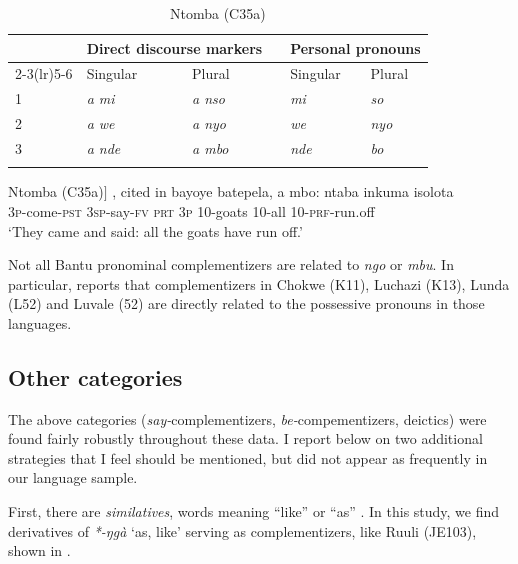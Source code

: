 \documentclass[output=paper,colorlinks,citecolor=brown,
]{langscibook}
\begin{document}
\begin{table}
\caption{Ntomba (C35a) \citep[209]{Botne:1995}}
\label{tab:gluckman:particletable}
\begin{tabular}{l l l l l l}
\lsptoprule
& \multicolumn{2}{l}{Direct discourse markers} & & \multicolumn{2}{l}{Personal pronouns}\\
\cmidrule(lr){2-3}\cmidrule(lr){5-6}
& Singular & Plural & & Singular & Plural\\
\midrule
1 & \textit{a mi} & \textit{a nso} & & \textit{mi} & \textit{so}\\
2 & \textit{a we} & \textit{a nyo} & & \textit{we} & \textit{nyo}\\
3 & \textit{a nde} & \textit{a mbo} & & \textit{nde} & \textit{bo}\\
\lspbottomrule
\end{tabular}
\end{table}

\ea\label{ex:gluckman:intomba.particle} Ntomba (C35a)$]$ \citep[69]{Gilliard:1928}, cited in \citep[208]{Botne:1995} 
\gll bayoye batepela, a mbo: ntaba inkuma isolota\\
3\textsc{p}-come-\textsc{pst} 3\textsc{sp}-say-\textsc{fv} \textsc{prt} 3\textsc{p} 10-goats 10-all 10-\textsc{prf}-run.off\\
\glt `They came and said: all the goats have run off.'  
\z

\noindent Not all Bantu pronominal complementizers are related to \textit{ngo} or \textit{mbu}. In particular, \citet{Kawasha:2006, Kawasha:2007} reports that complementizers in Chokwe (K11), Luchazi (K13), Lunda (L52) and Luvale (52) are directly related to the possessive pronouns in those languages. 

\subsection{Other categories}\label{sec:gluckman:minorcompsection}
The above categories (\textit{say-}complementizers, \textit{be-}compementizers, deictics) were found fairly robustly throughout these data. I report below on two additional strategies that I feel should be mentioned, but did not appear as frequently in our language sample. 

First, there are \textit{similatives}, words meaning ``like'' or ``as'' \citet{Kutevaetal:2019}. In this study, we find derivatives of \textit{*-ŋg\`a} `as, like' \citep[243]{Guthrie:1970} serving as complementizers, like Ruuli (JE103), shown in . 
\end{document}
